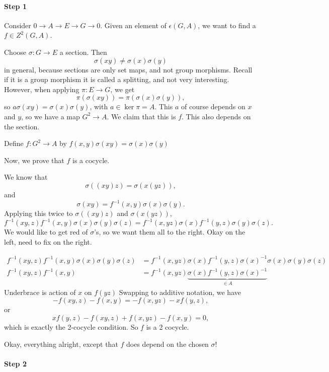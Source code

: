 \paragraph{Step 1}
Consider $0 \to  A \to  E \to  G \to 0$.
Given an element of $\epsilon(G, A)$, we want to find a  $f \in Z^2(G, A)$.

Choose $\sigma: G \to  E$ a section.
Then 
\[
    \sigma(xy) \neq \sigma(x) \sigma(y)
\] 
in general, because sections are only set maps, and not group morphisms. Recall if it is a group morphism it is called a splitting, and not very interesting.
However, when applying $\pi: E \to  G$, we get
\[
    \pi(\sigma(xy)) = \pi(\sigma(x) \sigma(y))
,\] 
so $a\sigma(xy) = \sigma(x)\sigma(y)$, with  $a \in  \ker \pi = A$.
This $a$ of course depends on  $x$ and  $y$, so we have a map  $G^2 \to  A$.
We claim that this is $f$.
This also depends on the section.
\begin{definition}
    Define $f: G^2 \to  A$ by $f(x,y) \sigma(xy) = \sigma(x)\sigma(y)$
\end{definition}

Now, we prove that $f$ is a cocycle.

We know that
\[
    \sigma((xy)z)  = \sigma(x(yz))
,\] 
and
\[
    \sigma(xy) = f^{-1}(x,y) \sigma(x) \sigma(y)
.\] 
Applying this twice to $\sigma((xy)z) $ and  $\sigma(x(yz))$,
 \[
     f^{-1}(xy,z) f^{-1}(x,y) \sigma(x)\sigma(y)\sigma(z) = f^{-1}(x,yz) \sigma(x) f^{-1}(y,z) \sigma(y) \sigma(z)
.\] 
We would like to get red of $\sigma$'s, so we want them all to the right. Okay on the left, need to fix on the right.

\begin{align*}
    f^{-1}(xy,z) f^{-1}(x,y) \sigma(x)\sigma(y)\sigma(z) &= f^{-1}(x,yz) \sigma(x) f^{-1}(y,z) \sigma(x)^{-1} \sigma(x)\sigma(y) \sigma(z)\\
    f^{-1}(xy,z) f^{-1}(x,y) &= f^{-1}(x,yz) \underbrace{\sigma(x) f^{-1}(y,z) \sigma(x)^{-1}}_{\in A}
\end{align*}
Underbrace is action of $x$ on  $f(yz)$
Swapping to additive notation, we have
\[
    -f(xy,z) - f(x,y) = -f(x,yz) - x f(y,z)
,\] 
or
\[
    xf(y,z) - f(xy,z) + f(x,yz) - f(x,y) = 0
,\] 
which is exactly the 2-cocycle condition.
So $f$ is a 2 cocycle.


Okay, everything alright, except that $f$ does depend on the chosen  $\sigma$! 

\paragraph{Step 2}

